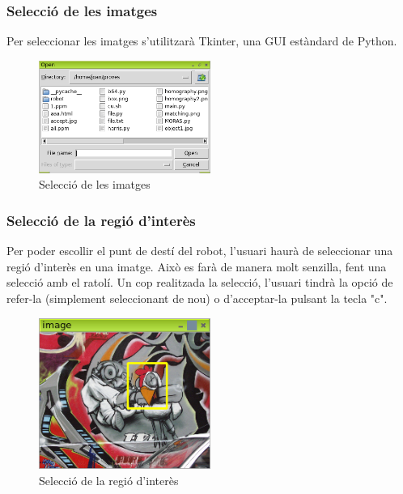 	\subsubsection{Selecció de les imatges}
		Per seleccionar les imatges s'utilitzarà Tkinter, una GUI estàndard de Python.\\
		\begin{figure}[H]
			\centering
			\includegraphics[width=0.5\textwidth]{images/fs}
			\caption{Selecció de les imatges}
		\end{figure}

	\subsubsection{Selecció de la regió d'interès}
		Per poder escollir el punt de destí del robot, l'usuari haurà de seleccionar una regió d'interès en una imatge. Això es farà de manera molt senzilla, fent una selecció amb el ratolí.
		Un cop realitzada la selecció, l'usuari tindrà la opció de refer-la (simplement seleccionant de nou) o d'acceptar-la pulsant la tecla "c".\\
		\begin{figure}[H]
			\centering
			\includegraphics[width=0.5\textwidth]{images/selection}
			\caption{Selecció de la regió d'interès}
		\end{figure}
\newpage
